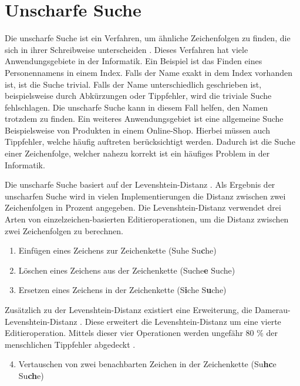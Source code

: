 \section{Unscharfe Suche}
\label{sec:unscharfe-suche}
Die unscharfe Suche ist ein Verfahren, um ähnliche Zeichenfolgen zu finden, die sich in ihrer Schreibweise unterscheiden \autocite{hall_approximate_1980}.
Dieses Verfahren hat viele Anwendungsgebiete in der Informatik.
Ein Beispiel ist das Finden eines Personennamens in einem Index.
Falls der Name exakt in dem Index vorhanden ist, ist die Suche trivial.
Falls der Name unterschiedlich geschrieben ist, beispielsweise durch Abkürzungen oder Tippfehler, wird die triviale Suche fehlschlagen.
Die unscharfe Suche kann in diesem Fall helfen, den Namen trotzdem zu finden.
Ein weiteres Anwendungsgebiet ist eine allgemeine Suche Beispielsweise von Produkten in einem Online-Shop.
Hierbei müssen auch Tippfehler, welche häufig auftreten berücksichtigt werden.
Dadurch ist die Suche einer Zeichenfolge, welcher nahezu korrekt ist ein häufiges Problem in der Informatik.

Die unscharfe Suche basiert auf der Levenshtein-Distanz \autocite{levenshtein_binary_1965}.
Als Ergebnis der unscharfen Suche wird in vielen Implementierungen die Distanz zwischen zwei Zeichenfolgen in Prozent angegeben.
Die Levenshtein-Distanz verwendet drei Arten von einzelzeichen-basierten Editieroperationen, um die Distanz zwischen zwei Zeichenfolgen zu berechnen.

\begin{enumerate}
    \item Einfügen eines Zeichens zur Zeichenkette (Suhe \rightarrow{} Su\textbf{c}he)
    \item Löschen eines Zeichens aus der Zeichenkette (Suche\textbf{e} \rightarrow{} Suche)
    \item Ersetzen eines Zeichens in der Zeichenkette (S\textbf{i}che \rightarrow{} S\textbf{u}che)
\end{enumerate}

Zusätzlich zu der Levenshtein-Distanz existiert eine Erweiterung, die Damerau-Levenshtein-Distanz \autocite{damerau_technique_1964}.
Diese erweitert die Levenshtein-Distanz um eine vierte Editieroperation.
Mittels dieser vier Operationen werden ungefähr 80 \% der menschlichen Tippfehler abgedeckt \autocite{damerau_technique_1964}.

\begin{enumerate}
    \setcounter{enumi}{3}
    \item Vertauschen von zwei benachbarten Zeichen in der Zeichenkette (Su\textbf{hc}e \rightarrow{} Su\textbf{ch}e)
\end{enumerate}

